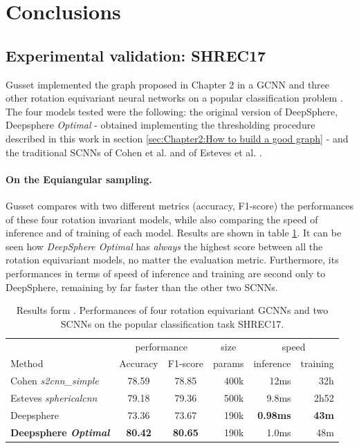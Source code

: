 

\section{Conclusions}\label{sec:Chapter4}




\subsection{Experimental validation: SHREC17}
\label{sec:Chapter5:Experimental validation}
Gusset \cite{Gusset} implemented the graph proposed in Chapter 2 in a GCNN and three other rotation equivariant neural networks on a popular classification problem \cite{SHREC17}. The four models tested were the following: the original version of DeepSphere, Deepsphere \textit{Optimal} - obtained implementing the thresholding procedure described in this work in section \ref{sec:Chapter2:How to build a good graph} - and the traditional SCNNs of Cohen et al. and of Esteves et al.  \cite{SCNN} \cite{Esteves}.
\paragraph{On the Equiangular sampling.} Gusset compares with two different metrics  (accuracy, F1-score) the performances of these four rotation invariant models, while also comparing the speed of inference and of training of each model. Results are shown in table \ref{tab:SHREC17_class}.  It can be seen how \textit{DeepSphere Optimal} has \textit{always} the highest score between all the rotation equivariant models, no matter the evaluation metric. Furthermore, its performances in terms of speed of inference and training are second only to DeepSphere, remaining by far faster than the other two SCNNs. 
\begin{table}[ht]
	\centering
	\begin{tabular}{l|c c r r r}
		\multicolumn{1}{l}{} & \multicolumn{2}{c}{performance} & \multicolumn{1}{c}{size} & \multicolumn{2}{c}{speed}\\
		\cmidrule(lr){2-3} \cmidrule(lr){4-4} \cmidrule(lr){5-6}
		\multicolumn{1}{l}{Method} & Accuracy & F1-score & params & inference & training \\ \hline
		Cohen \emph{s2cnn\_simple} & 78.59 & 78.85 & 400k & 12ms & 32h\\
		Esteves \emph{sphericalcnn} & 79.18 & 79.36 & 500k & 9.8ms & 2h52\\ \hline
		Deepsphere & 73.36 & 73.67 & 190k & \textbf{0.98ms} & \textbf{43m} \\
		\textbf{Deepsphere \emph{Optimal}} & \textbf{80.42} & \textbf{80.65} & 190k & 1.0ms & 48m
	\end{tabular}
	\caption{Results form \cite{Gusset}. Performances of four rotation equivariant GCNNs and two SCNNs on the popular classification task SHREC17.}
	\label{tab:SHREC17_class}
\end{table}
